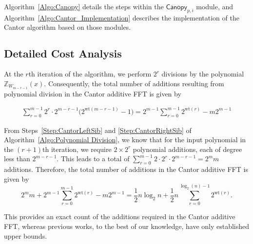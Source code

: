 Algorithm~\ref{Algo:Canopy} details the steps within the \(\mathsf{Canopy}_{p, i}\) module, and Algorithm~\ref{Algo:Cantor_Implementation} describes the implementation of the Cantor algorithm based on those modules. 

\subsection{Detailed Cost Analysis}
At the $r$th iteration of the algorithm, we perform $2^{r}$ divisions by the polynomial $\mathbb{Z}_{W_{m-r-1}}(x)$. Consequently, the total number of additions resulting from polynomial division in the Cantor additive FFT is given by

\begin{equation*}
	\begin{aligned}
		\displaystyle{\sum_{r=0}^{m-1} 2^r \cdot 2^{m-r-1} \big( 2^{\text{wt}(m-r-1)}-1 \big) }
		= 2^{m-1} \displaystyle{\sum_{r=0}^{m-1} 2^{\text{wt}(r)} } - m2^{m-1}
	\end{aligned}
\end{equation*}

From Steps~\ref{Step:CantorLeftSib} and \ref{Step:CantorRightSib} of Algorithm~\ref{Algo:Polynomial Division}, we know that for the input polynomial in the $(r+1)$th iteration, we require $2 \times 2^r$ polynomial additions, each of degree less than $2^{m-r-1}$. This leads to a total of  $\sum_{r=0}^{m-1} 2\cdot 2^{r} \cdot 2^{m-r-1}=2^m m$ additions. Therefore, the total number of additions in the Cantor additive FFT is given by \[2^m m + 2^{m-1} \displaystyle{\sum_{r=0}^{m-1} 2^{\text{wt}(r)} } - m2^{m-1}= \frac{1}{2} n\log_2 n + \frac{1}{2}n \sum_{r=0}^{\log_2(n)-1} 2^{\text{wt}(r)}.\]


This provides an exact count of the additions required in the Cantor additive FFT, whereas previous works, to the best of our knowledge, have only established upper bounds.

